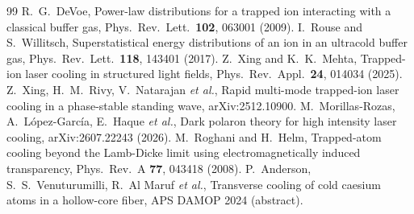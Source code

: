 \documentclass[11pt,a4paper]{article}
\begin{document}
\begin{thebibliography}{99}
 R.~G.~DeVoe, Power-law distributions for a trapped ion interacting with a classical buffer gas, Phys.\ Rev.\ Lett.\ \textbf{102}, 063001 (2009).
 I.~Rouse and S.~Willitsch, Superstatistical energy distributions of an ion in an ultracold buffer gas, Phys.\ Rev.\ Lett.\ \textbf{118}, 143401 (2017).
 Z.~Xing and K.~K.~Mehta, Trapped-ion laser cooling in structured light fields, Phys.\ Rev.\ Appl.\ \textbf{24}, 014034 (2025).
 Z.~Xing, H.~M.~Rivy, V.~Natarajan \emph{et al.}, Rapid multi-mode trapped-ion laser cooling in a phase-stable standing wave, arXiv:2512.10900.
 M.~Morillas-Rozas, A.~L\'opez-Garc\'ia, E.~Haque \emph{et al.}, Dark polaron theory for high intensity laser cooling, arXiv:2607.22243 (2026).
 M.~Roghani and H.~Helm, Trapped-atom cooling beyond the Lamb-Dicke limit using electromagnetically induced transparency, Phys.\ Rev.\ A \textbf{77}, 043418 (2008).
 P.~Anderson, S.~S.~Venuturumilli, R.~Al Maruf \emph{et al.}, Transverse cooling of cold caesium atoms in a hollow-core fiber, APS DAMOP 2024 (abstract).
\end{thebibliography}
\end{document}
